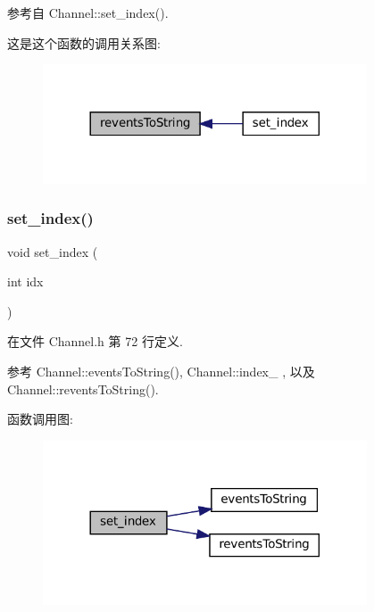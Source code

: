 参考自 Channel\+::set\+\_\+index().

这是这个函数的调用关系图\+:
\nopagebreak
\begin{figure}[H]
\begin{center}
\leavevmode
\includegraphics[width=272pt]{classmuduo_1_1net_1_1Channel_a999f712b429fc3bef932df5198f93ad7_icgraph}
\end{center}
\end{figure}
\mbox{\label{classmuduo_1_1net_1_1Channel_ac9a4cd0efc3148a6fee45b2ab4f61cb6}} 
\subsubsection{\texorpdfstring{set\+\_\+index()}{set\_index()}}
{\footnotesize\ttfamily void set\+\_\+index (\begin{DoxyParamCaption}\item[{int}]{idx }\end{DoxyParamCaption})\hspace{0.3cm}{\ttfamily [inline]}}



在文件 Channel.\+h 第 72 行定义.



参考 Channel\+::events\+To\+String(), Channel\+::index\+\_\+ , 以及 Channel\+::revents\+To\+String().

函数调用图\+:
\nopagebreak
\begin{figure}[H]
\begin{center}
\leavevmode
\includegraphics[width=272pt]{classmuduo_1_1net_1_1Channel_ac9a4cd0efc3148a6fee45b2ab4f61cb6_cgraph}
\end{center}
\end{figure}
\mbox{\label{classmuduo_1_1net_1_1Channel_ac155f87f8dc6f7bdf9559d4d2e5a9a4b}} 
